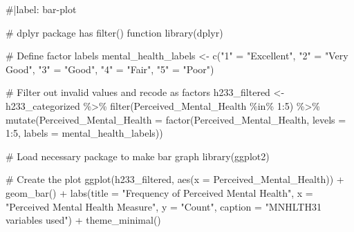 \documentclass[
]{apa7}
\newenvironment{Shaded}{\begin{snugshade}}{\end{snugshade}}
\newcommand{\AttributeTok}[1]{\textcolor[rgb]{0.40,0.45,0.13}{#1}}
\newcommand{\CommentTok}[1]{\textcolor[rgb]{0.37,0.37,0.37}{#1}}
\newcommand{\DecValTok}[1]{\textcolor[rgb]{0.68,0.00,0.00}{#1}}
\newcommand{\FunctionTok}[1]{\textcolor[rgb]{0.28,0.35,0.67}{#1}}
\newcommand{\NormalTok}[1]{\textcolor[rgb]{0.00,0.23,0.31}{#1}}
\newcommand{\OtherTok}[1]{\textcolor[rgb]{0.00,0.23,0.31}{#1}}
\newcommand{\SpecialCharTok}[1]{\textcolor[rgb]{0.37,0.37,0.37}{#1}}
\newcommand{\StringTok}[1]{\textcolor[rgb]{0.13,0.47,0.30}{#1}}
\begin{document}
\begin{Shaded}
\begin{Highlighting}[]
\CommentTok{\#|label: bar{-}plot}

\CommentTok{\# dplyr package has filter() function}
\FunctionTok{library}\NormalTok{(dplyr)}

\CommentTok{\# Define factor labels}
\NormalTok{mental\_health\_labels }\OtherTok{\textless{}{-}} \FunctionTok{c}\NormalTok{(}\StringTok{"1"} \OtherTok{=} \StringTok{"Excellent"}\NormalTok{, }
                          \StringTok{"2"} \OtherTok{=} \StringTok{"Very Good"}\NormalTok{, }
                          \StringTok{"3"} \OtherTok{=} \StringTok{"Good"}\NormalTok{, }
                          \StringTok{"4"} \OtherTok{=} \StringTok{"Fair"}\NormalTok{, }
                          \StringTok{"5"} \OtherTok{=} \StringTok{"Poor"}\NormalTok{)}

\CommentTok{\# Filter out invalid values and recode as factors}
\NormalTok{h233\_filtered }\OtherTok{\textless{}{-}}\NormalTok{ h233\_categorized }\SpecialCharTok{\%\textgreater{}\%}
  \FunctionTok{filter}\NormalTok{(Perceived\_Mental\_Health }\SpecialCharTok{\%in\%} \DecValTok{1}\SpecialCharTok{:}\DecValTok{5}\NormalTok{) }\SpecialCharTok{\%\textgreater{}\%}
  \FunctionTok{mutate}\NormalTok{(}\AttributeTok{Perceived\_Mental\_Health =} \FunctionTok{factor}\NormalTok{(Perceived\_Mental\_Health, }
                                          \AttributeTok{levels =} \DecValTok{1}\SpecialCharTok{:}\DecValTok{5}\NormalTok{, }
                                          \AttributeTok{labels =}\NormalTok{ mental\_health\_labels))}

\CommentTok{\# Load necessary package to make bar graph}
\FunctionTok{library}\NormalTok{(ggplot2)}

\CommentTok{\# Create the plot}
\FunctionTok{ggplot}\NormalTok{(h233\_filtered, }\FunctionTok{aes}\NormalTok{(}\AttributeTok{x =}\NormalTok{ Perceived\_Mental\_Health)) }\SpecialCharTok{+}
  \FunctionTok{geom\_bar}\NormalTok{() }\SpecialCharTok{+}
  \FunctionTok{labs}\NormalTok{(}\AttributeTok{title =} \StringTok{"Frequency of Perceived Mental Health"}\NormalTok{, }
       \AttributeTok{x =} \StringTok{"Perceived Mental Health Measure"}\NormalTok{, }
       \AttributeTok{y =} \StringTok{"Count"}\NormalTok{, }
       \AttributeTok{caption =} \StringTok{"MNHLTH31 variables used"}\NormalTok{) }\SpecialCharTok{+}
  \FunctionTok{theme\_minimal}\NormalTok{()}
\end{Highlighting}
\end{Shaded}
\end{document}
